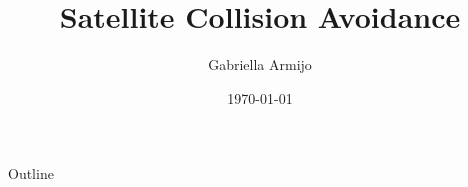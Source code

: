 \documentclass{beamer}
\title{Satellite Collision Avoidance}
\author{Gabriella Armijo}
\date{\today}
\begin{document}
\begin{frame}
    \titlepage 
\end{frame}

\logo{}


\begin{frame}{Outline}
    \tableofcontents
\end{frame}


\section{}
\begin{frame}{}

\end{frame}


\section{}
\begin{frame}{}

\end{frame} 
\end{document}
